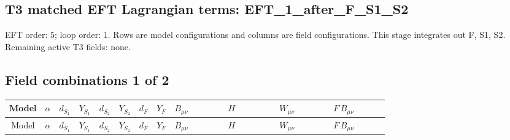 \documentclass[8pt]{article}
\begin{document}
\begin{landscape}
\section*{T3 matched EFT Lagrangian terms: EFT\_1\_after\_F\_S1\_S2}
EFT order: $5$; loop order: $1$. 
Rows are model configurations and columns are field configurations. This stage integrates out F, S1, S2. Remaining active T3 fields: none.
\tiny
\subsection*{Field combinations 1 of 2}
\begin{longtable}{@{}cccccccc >{\raggedright\arraybackslash}p{0.18\linewidth} >{\raggedright\arraybackslash}p{0.18\linewidth} >{\raggedright\arraybackslash}p{0.18\linewidth} >{\raggedright\arraybackslash}p{0.18\linewidth}@{}}
\toprule
Model & $\alpha$ & $d_{S_1}$ & $Y_{S_1}$ & $d_{S_2}$ & $Y_{S_2}$ & $d_F$ & $Y_F$ & $B_{\mu\nu}$ & $H$ & $W_{\mu\nu}$ & $F\,B_{\mu\nu}$ \\
\midrule
\endfirsthead
\toprule
Model & $\alpha$ & $d_{S_1}$ & $Y_{S_1}$ & $d_{S_2}$ & $Y_{S_2}$ & $d_F$ & $Y_F$ & $B_{\mu\nu}$ & $H$ & $W_{\mu\nu}$ & $F\,B_{\mu\nu}$ \\
\midrule
\endhead

\end{longtable}
\end{landscape}
\end{document}
